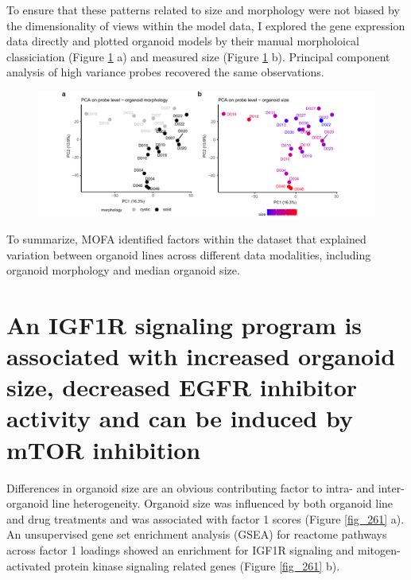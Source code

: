 \begin{flushleft}
\bigbreak
To ensure that these patterns related to size and morphology were not biased by the dimensionality of views within the model data, I explored the gene expression data directly and plotted organoid models by their manual morpholoical classiciation (Figure \ref{fig_241} a) and measured size (Figure \ref{fig_241} b). Principal component analysis of high variance probes recovered the same observations.

\begin{figure}[h!]
\centering
\includegraphics[width=\textwidth,
                height=\textheight,
                keepaspectratio]{figures/promise/pdf/fig_4_1.pdf}
\caption{}
\label{fig_241}
\end{figure}

\bigbreak
To summarize, MOFA identified factors within the dataset that explained variation between organoid lines across different data modalities, including organoid morphology and median organoid size. 

\newpage
\section{An IGF1R signaling program is associated with increased organoid size, decreased EGFR inhibitor activity and can be induced by mTOR inhibition}

Differences in organoid size are an obvious contributing factor to intra- and inter-organoid line heterogeneity. Organoid size was influenced by both organoid line and drug treatments and was associated with factor 1 scores (Figure \ref{fig_261} a). An unsupervised gene set enrichment analysis (GSEA) for reactome pathways across factor 1 loadings showed an enrichment for IGF1R signaling and mitogen-activated protein kinase signaling related genes (Figure \ref{fig_261} b). 


\end{flushleft}
